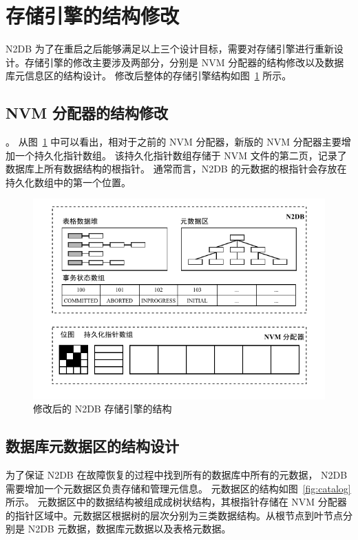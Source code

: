 \section{存储引擎的结构修改}

N2DB 为了在重启之后能够满足以上三个设计目标，需要对存储引擎进行重新设计。存储引擎的修改主要涉及两部分，分别是 NVM 分配器的结构修改以及数据库元信息区的结构设计。
修改后整体的存储引擎结构如图~\ref{fig:nvm-allocator} 所示。

\subsection{NVM 分配器的结构修改}。
从图~\ref{fig:nvm-allocator} 中可以看出，相对于之前的 NVM 分配器，新版的 NVM 分配器主要增加一个持久化指针数组。
该持久化指针数组存储于 NVM 文件的第二页，记录了数据库上所有数据结构的根指针。
通常而言，N2DB 的元数据的根指针会存放在持久化数组中的第一个位置。

\begin{figure}[ht]
    \centering
    \includegraphics[width=1\linewidth]{figures/new-nvm-allocator}
    \caption{修改后的 N2DB 存储引擎的结构}
    \label{fig:nvm-allocator}
\end{figure}

\subsection{数据库元数据区的结构设计}

为了保证 N2DB 在故障恢复的过程中找到所有的数据库中所有的元数据， N2DB 需要增加一个元数据区负责存储和管理元信息。
元数据区的结构如图~\ref{fig:catalog} 所示。
元数据区中的数据结构被组成成树状结构，其根指针存储在 NVM 分配器的指针区域中。元数据区根据树的层次分别为三类数据结构。从根节点到叶节点分别是 N2DB 元数据，数据库元数据以及表格元数据。

